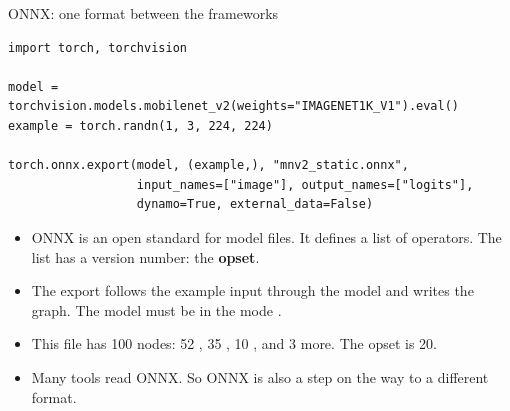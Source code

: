 \begin{frame}[fragile]{ONNX: one format between the frameworks}
\begin{lstlisting}[style=python]
import torch, torchvision

model = torchvision.models.mobilenet_v2(weights="IMAGENET1K_V1").eval()
example = torch.randn(1, 3, 224, 224)

torch.onnx.export(model, (example,), "mnv2_static.onnx",
                  input_names=["image"], output_names=["logits"],
                  dynamo=True, external_data=False)
\end{lstlisting}
  \small
  \begin{itemize}
    \item ONNX is an open standard for model files. It defines a list of
          operators. The list has a version number: the \textbf{opset}.
    \item The export follows the example input through the model and
          writes the graph. The model must be in the mode .
    \item This file has 100 nodes: 52 , 35 , 10
          , and 3 more. The opset is 20.
    \item Many tools read ONNX. So ONNX is also a step on the way to a
          different format.
  \end{itemize}
\end{frame}

